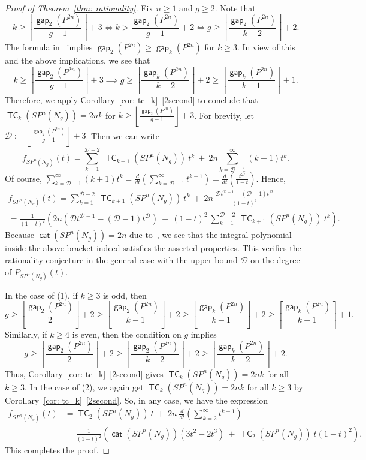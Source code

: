 \documentclass[amscd,amssymb,verbatim,10pt]{amsart}
\numberwithin{equation}{section}
\theoremstyle{plain}
\theoremstyle{definition}
\DeclareMathOperator{\cat}{{\mathsf{cat}}}
\DeclareMathOperator{\TC}{{\mathsf{TC}}}
\DeclareMathOperator{\gap}{{\mathsf{gap}}}
\newcommand{\D}{\mathscr{D}}
\begin{document}
\begin{proof}[Proof of Theorem~\ref{thm: rationality}]
    Fix $n\ge 1$ and $g\ge 2$. Note that 
    \[
    k\ge\left\lfloor\frac{\gap_2(P^{2n})}{g-1}\right\rfloor+3\iff k >\frac{\gap_2(P^{2n})}{g-1}+2\iff g \ge\left\lfloor \frac{\gap_2(P^{2n})}{k-2}\right\rfloor+2.
    \]
    The formula in~\cite[Theorem 1.6]{Dav} implies $\gap_2(P^{2n})\ge\gap_k(P^{2n})$ for $k\ge 3$. In view of this and the above implications, we see that
    \[
    k\ge\left\lfloor\frac{\gap_2(P^{2n})}{g-1}\right\rfloor+3\implies g\ge\left\lfloor \frac{\gap_k(P^{2n})}{k-2}\right\rfloor+2\ge     \left\lceil \frac{\gap_k(P^{2n})}{k-1}\right\rceil+1.
    \]
    Therefore, we apply Corollary~\ref{cor: tc_k}~\eqref{2second} to conclude that $\TC_k(SP^n(N_g))=2nk$ for $ k\ge\left\lfloor\tfrac{\gap_2(P^{2n})}{g-1}\right\rfloor+3$. For brevity, let $\D:=\left\lfloor\tfrac{\gap_2(P^{2n})}{g-1}\right\rfloor+3$. Then we can write
    \[
    f_{SP^n(N_g)}(t)=\sum_{k=1}^{\D-2}\ \TC_{k+1}(SP^n(N_{g})) \ t^k \ +\ 2n\sum_{k=\D-1}^{\infty} (k+1)t^k.
        \]
Of course, $\sum_{k=\D-1}^{\infty} (k+1)t^k=\tfrac{d}{dt}\left(\sum_{k=\D-1}^{\infty} t^{k+1}\right)=\tfrac{d}{dt}\left(\tfrac{t^{\D}}{1-t}\right)$. Hence,
\begin{multline*}
     f_{SP^n(N_g)}(t)=\sum_{k=1}^{\D-2}\ \TC_{k+1}(SP^n(N_{g})) \ t^k \ +\ 2n\ \frac{\D t^{\D-1}-(\D-1)t^{\D}}{(1-t)^2}
\\
=\frac{1}{(1-t)^2} \left(2n\left(\D t^{\D-1}-(\D-1)t^{\D}\right)\ + \ (1-t)^2\ \sum_{k=1}^{\D-2}\ \TC_{k+1}(SP^n(N_{g})) \ t^k \right).
\end{multline*}
Because $\cat(SP^n(N_g))=2n$ due to~\cite[Theorem~B]{Ja}, we see that the integral polynomial inside the above bracket indeed satisfies the asserted properties. This verifies the rationality conjecture in the general case with the upper bound $\D$ on the degree of $P_{SP^n(N_g)}(t)$.

In the case of (1), if $k\ge 3$ is odd, then
\[
g\ge\left\lfloor\frac{\gap_2(P^{2n})}{2}\right\rfloor+2 \ge \left\lfloor\frac{\gap_2(P^{2n})}{k-1}\right\rfloor+2\ge\left\lfloor\frac{\gap_k(P^{2n})}{k-1}\right\rfloor+2\ge\left\lceil \frac{\gap_k(P^{2n})}{k-1}\right\rceil+1.
\]
Similarly, if $k\ge 4$ is even, then the condition on $g$ implies
\[
g\ge\left\lfloor\frac{\gap_2(P^{2n})}{2}\right\rfloor+2 \ge \left\lfloor\frac{\gap_2(P^{2n})}{k-2}\right\rfloor+2\ge\left\lfloor\frac{\gap_k(P^{2n})}{k-2}\right\rfloor+2.
\]
Thus, Corollary~\ref{cor: tc_k}~\eqref{2second} gives $\TC_k(SP^n(N_g))=2nk$ for all $k\ge 3$. In the case of (2), we again get $\TC_k(SP^n(N_g))=2nk$ for all $k\ge 3$ by Corollary~\ref{cor: tc_k}~\eqref{2second}. So, in any case, we have the expression
\begin{align*}
 f_{SP^n(N_g)}(t)&=\TC_2(SP^n(N_g)) \ t\ + \ 2n\ \frac{d}{dt}\left(\sum_{k=2}^{\infty}t^{k+1} \right) 
\\
&=
\frac{1}{(1-t)^2}\left(\cat\left(SP^n(N_g)\right)\left(3t^2-2t^3\right) \ + \ \TC_2(SP^n(N_g)) \ t\left(1-t\right)^2\right).
\end{align*}
This completes the proof.
\end{proof}
\end{document}
